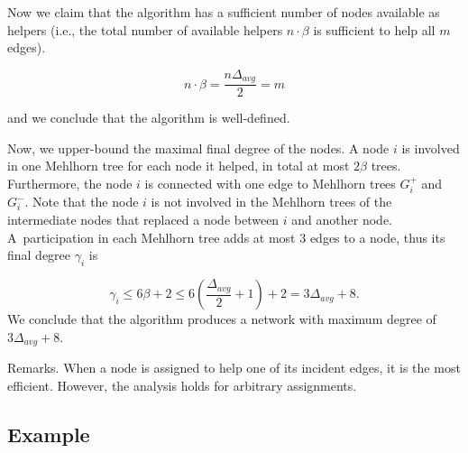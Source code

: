 \documentclass{article}
\begin{document}
\medskip

Now we claim that the algorithm has a sufficient number of nodes available as helpers 
 (i.e., the total number of available helpers $n \cdot \beta$ is sufficient to help all $m$ edges).

  $$n \cdot \beta = \frac{n\Delta_{avg}}{2} = m$$

and we conclude that the algorithm is well-defined.

\medskip
\newpage
Now, we upper-bound the maximal final degree of the nodes.
A node $i$ is involved in one Mehlhorn tree
for each node it helped, in total at most $2\beta$ trees.
Furthermore, the node $i$ is connected with one edge to Mehlhorn trees $G_i^+$ and $G_i^-$.
Note that the node $i$ is not involved in the Mehlhorn trees of the intermediate nodes
that replaced a node between $i$ and another node.
A~participation in each Mehlhorn tree adds at most $3$ edges to a node, thus its final degree $\gamma_i$ is

$$\gamma_i \leq 6\beta + 2 \leq 6 \left(\frac{\Delta_{avg}}{2}+1\right) + 2 =  3\Delta_{avg} + 8.$$
%
We conclude that the algorithm produces a network
with maximum degree of $3\Delta_{avg} + 8$.

Remarks.
When a node is assigned to help one of its incident edges, it is the most efficient.
However, the analysis holds for arbitrary assignments.

\subsection{Example}
\end{document}
